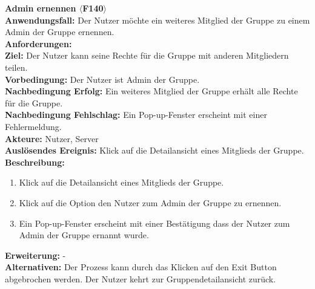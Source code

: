 \documentclass[parskip=full]{scrartcl}
\begin{document}
\textbf{Admin ernennen $\langle$F140$\rangle$}\\
\textbf{Anwendungsfall:} Der Nutzer möchte ein weiteres Mitglied der Gruppe zu einem Admin der Gruppe ernennen.\\
\textbf{Anforderungen:} \\
\textbf{Ziel:} Der Nutzer kann seine Rechte für die Gruppe mit anderen Mitgliedern teilen.\\
\textbf{Vorbedingung:} Der Nutzer ist Admin der Gruppe.\\
\textbf{Nachbedingung Erfolg:} Ein weiteres Mitglied der Gruppe erhält alle Rechte für die Gruppe.\\
\textbf{Nachbedingung Fehlschlag:} Ein Pop-up-Fenster erscheint mit einer Fehlermeldung.\\
\textbf{Akteure:} Nutzer, Server \\
\textbf{Auslösendes Ereignis:} Klick auf die Detailansicht eines Mitglieds der Gruppe.\\
\textbf{Beschreibung:}
\begin{enumerate}
    \item Klick auf die Detailansicht eines Mitglieds der Gruppe.
    \item Klick auf die Option den Nutzer zum Admin der Gruppe zu ernennen.
    \item Ein Pop-up-Fenster erscheint mit einer Bestätigung dass der Nutzer zum Admin der Gruppe ernannt wurde.
\end{enumerate}
\textbf{Erweiterung:} -\\
\textbf{Alternativen:} Der Prozess kann durch das Klicken auf den Exit Button abgebrochen werden. Der Nutzer kehrt zur Gruppendetailansicht zurück.\\
\newpage
\end{document}
